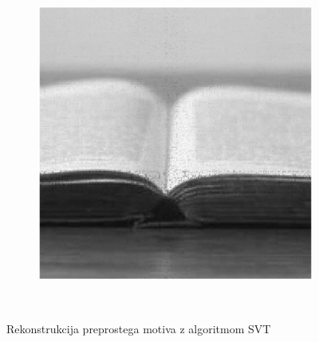 \begin{figure}
\begin{subfigure}{0.325\linewidth}
    \end{subfigure}
    \hfill
    \begin{subfigure}{0.325\linewidth}
        \includegraphics[width=\linewidth]{Poglavja/Slike/preprosta grayscale 300/rez60SVT.png}
    \end{subfigure}\\[-1cm]
    \caption{Rekonstrukcija preprostega motiva z algoritmom SVT}
    \vspace{0.5cm}
\end{figure}
    
